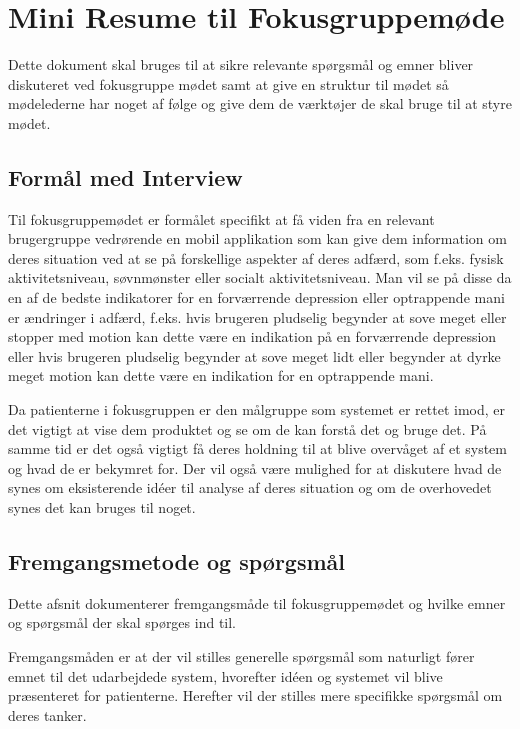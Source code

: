 \chapter{Mini Resume til Fokusgruppemøde}
Dette dokument skal bruges til at sikre relevante spørgsmål og emner bliver diskuteret ved fokusgruppe mødet samt at give en struktur til mødet så mødelederne har noget af følge og give dem de værktøjer de skal bruge til at styre mødet.

\section{Formål med Interview}
Til fokusgruppemødet er formålet specifikt at få viden fra en relevant brugergruppe vedrørende en mobil applikation som kan give dem information om deres situation ved at se på forskellige aspekter af deres adfærd, som f.eks. fysisk aktivitetsniveau, søvnmønster eller socialt aktivitetsniveau. 
Man vil se på disse da en af de bedste indikatorer for en forværrende depression eller optrappende mani er ændringer i adfærd, f.eks. hvis brugeren pludselig begynder at sove meget eller stopper med motion kan dette være en indikation på en forværrende depression eller hvis brugeren pludselig begynder at sove meget lidt eller begynder at dyrke meget motion kan dette være en indikation for en optrappende mani.
 
Da patienterne i fokusgruppen er den målgruppe som systemet er rettet imod, er det vigtigt at vise dem produktet og se om de kan forstå det og bruge det.
På samme tid er det også vigtigt få deres holdning til at blive overvåget af et system og hvad de er bekymret for.
Der vil også være mulighed for at diskutere hvad de synes om eksisterende idéer til analyse af deres situation og om de overhovedet synes det kan bruges til noget.

\section{Fremgangsmetode og spørgsmål}
Dette afsnit dokumenterer fremgangsmåde til fokusgruppemødet og hvilke emner og spørgsmål der skal spørges ind til.

Fremgangsmåden er at der vil stilles generelle spørgsmål som naturligt fører emnet til det udarbejdede system, hvorefter idéen og systemet vil blive præsenteret for patienterne. Herefter vil der stilles mere specifikke spørgsmål om deres tanker.


